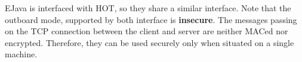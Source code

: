 EJava is interfaced with HOT, so they share a similar interface. Note
that the outboard mode, supported by both interface is {\bf
insecure}. The messages passing on the TCP connection between the
client and server are neither MACed nor encrypted. Therefore, they can
be used securely only when situated on a single machine. 

